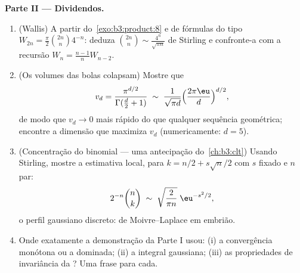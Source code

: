 \begin{problem}
\medskip
\noindent\textbf{Parte II --- Dividendos.}
\begin{enumerate}[resume]
  \item (Wallis) A partir do~\cref{exo:b3:product:8} e de fórmulas do tipo $W_{2n} =
        \frac\pi2\binom{2n}n4^{-n}$:
        deduza $\binom{2n}{n} \sim \frac{4^n}{\sqrt{\pi n}}$ de Stirling e confronte-a com a recursão $W_{n} =
        \frac{n-1}nW_{n-2}$.
  \item (Os volumes das bolas colapsam) Mostre que
        \[
        v_d = \frac{\pi^{d/2}}{\Gamma(\frac d2 + 1)}
        \;\sim\; \frac{1}{\sqrt{\pi d}}
        \Bigl(\frac{2\pi\eu}{d}\Bigr)^{d/2},
        \]
        de modo que $v_d \to 0$ mais rápido do que qualquer sequência
        geométrica; encontre a dimensão que maximiza $v_d$
        (numericamente: $d =
        5$).
  \item (Concentração do binomial --- uma antecipação do~\cref{ch:b3:clt}) Usando Stirling, mostre a estimativa local, para
        $k = n/2 + s\sqrt n/2$ com $s$ fixado e $n$ par:
        \[
        2^{-n}\binom{n}{k} \;\sim\;
        \sqrt{\frac{2}{\pi n}}\;\eu^{-s^2/2},
        \]
        o perfil gaussiano discreto: de Moivre--Laplace em embrião.
  \item Onde exatamente a demonstração da Parte I usou: (i) a
        convergência monótona ou a dominada; (ii) a integral gaussiana;
        (iii) as propriedades de invariância da ? Uma
        frase para cada.
\end{enumerate}


\end{problem}
